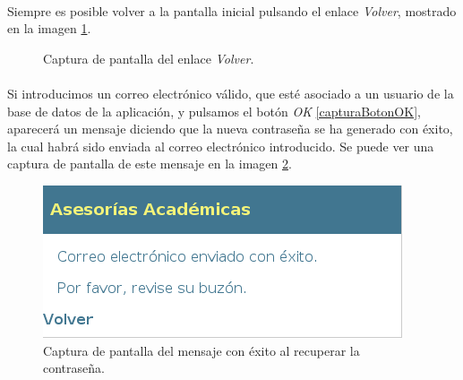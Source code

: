   \paragraph{}Siempre es posible volver a la pantalla inicial pulsando el enlace
  \textit{Volver}, mostrado en la imagen \ref{capturaEnlaceVolver}.

  \begin{figure}[!ht]
    \begin{center}
      \caption{Captura de pantalla del enlace \textit{Volver}.}
      \label{capturaEnlaceVolver}
    \end{center}
  \end{figure}

  \paragraph{}Si introducimos un correo electrónico válido, que esté asociado a
  un usuario de la base de datos de la aplicación, y pulsamos el botón
  \textit{OK} \ref{capturaBotonOK}, aparecerá un mensaje diciendo que la nueva
  contraseña se ha generado con éxito, la cual habrá sido enviada al correo
  electrónico introducido. Se puede ver una captura de pantalla de este mensaje
  en la imagen \ref{capturaPedirCorreoExito}.

  \begin{figure}[!ht]
    \begin{center}
      \includegraphics[scale=0.6]{4.Funcionamiento_Aplicacion/4.2.Acceso_Sistema/4.2.1.Recordar_Password/Capturas/pedir_correo_exito.png}
      \caption{Captura de pantalla del mensaje con éxito al recuperar la contraseña.}
      \label{capturaPedirCorreoExito}
    \end{center}
  \end{figure}

